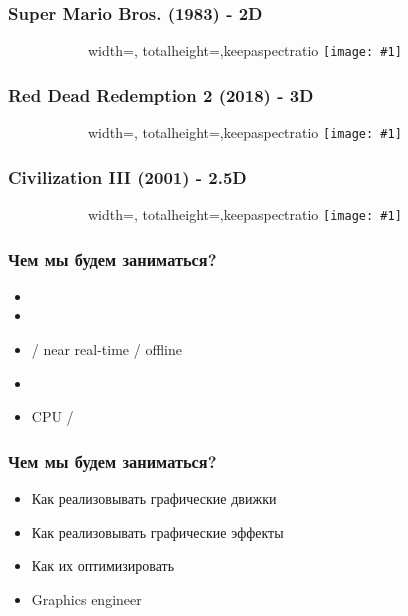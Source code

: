 \documentclass{beamer}
\newcommand{\slideimage}[1]{
  \begin{figure}
    \begin{adjustbox}{width=\textwidth, totalheight=\textheight-2\baselineskip-2\baselineskip,keepaspectratio}
      \texttt{[image: \#1]}
    \end{adjustbox}
  \end{figure}
}
\begin{document}
\begin{frame}
\frametitle{Super Mario Bros. (1983) - 2D}
\begin{figure}
\slideimage{mario.jpg}
\end{figure}
\end{frame}

\begin{frame}
\frametitle{Red Dead Redemption 2 (2018) - 3D}
\begin{figure}
\slideimage{rdr2.jpg}
\end{figure}
\end{frame}


\begin{frame}
\frametitle{Civilization III (2001) - 2.5D}
\begin{figure}
\slideimage{civ3.png}
\end{figure}
\end{frame}


\begin{frame}
\frametitle{Чем мы будем заниматься?}
\begin{itemize}
\item {}
\item {}
\item {} / near real-time / offline
\item {}
\item CPU / 
\end{itemize}
\end{frame}

\begin{frame}
\frametitle{Чем мы будем заниматься?}
\begin{itemize}
\pause
\item Как реализовывать графические движки
\pause
\item Как реализовывать графические эффекты
\pause
\item Как их оптимизировать
\pause
\item Graphics engineer
\end{itemize}
\end{frame}
\end{document}
